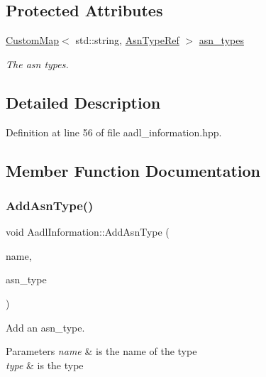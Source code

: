 \subsection*{Protected Attributes}
\begin{DoxyCompactItemize}
\item 
\hyperlink{custom__map_8hpp_a18ca01763abbe3e5623223bfe5aaac6b}{Custom\+Map}$<$ std\+::string, \hyperlink{asn__type_8hpp_a456d7cf50c15d087cc0428ae80834b35}{Asn\+Type\+Ref} $>$ \hyperlink{classAadlInformation_a500ce2a56c9bc2c65d18255e18b0844b}{asn\+\_\+types}
\begin{DoxyCompactList}\small\item\em The asn types. \end{DoxyCompactList}\end{DoxyCompactItemize}


\subsection{Detailed Description}


Definition at line 56 of file aadl\+\_\+information.\+hpp.



\subsection{Member Function Documentation}
\mbox{\label{classAadlInformation_a8926df49d647b748f1b6aa30f639b175}} 
\subsubsection{\texorpdfstring{Add\+Asn\+Type()}{AddAsnType()}}
{\footnotesize\ttfamily void Aadl\+Information\+::\+Add\+Asn\+Type (\begin{DoxyParamCaption}\item[{const std\+::string \&}]{name,  }\item[{const \hyperlink{asn__type_8hpp_a456d7cf50c15d087cc0428ae80834b35}{Asn\+Type\+Ref} \&}]{asn\+\_\+type }\end{DoxyParamCaption})}



Add an asn\+\_\+type. 


\begin{DoxyParams}{Parameters}
{\em name} & is the name of the type \\
\hline
{\em type} & is the type \\
\hline
\end{DoxyParams}


